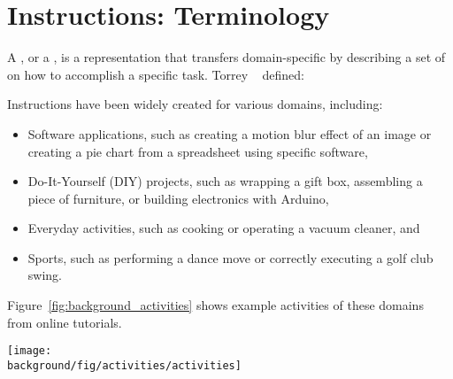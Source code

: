 
\section{Instructions: Terminology}
\label{background_terms}

A , or a , is a representation that transfers domain-specific  by describing a set of  on how to accomplish a specific task. Torrey \ea{}~\cite{Torrey:2007he} defined:
\begin{quote}
\end{quote}
%
%
Instructions have been widely created for various domains, including:

\begin{itemize}
  \item Software applications, such as creating a motion blur effect of an image or creating a pie chart from a spreadsheet using specific software,
  \item Do-It-Yourself (DIY) projects, such as wrapping a gift box, assembling a piece of furniture, or building electronics with Arduino,
  \item Everyday activities, such as cooking or operating a vacuum cleaner, and
  \item Sports, such as performing a dance move or correctly executing a golf club swing.
\end{itemize}

Figure~\ref{fig:background_activities} shows example activities of these domains from online tutorials.
\\

\begin{figure*}[b!]
  \centering
  \begin{minipage}{\textwidth}
  \texttt{[image: \\background/fig/activities/activities]}
  \caption[Example activities in tutorial domains.]{Example activities in tutorial domains:
  a) image manipulations using a software application
  \footnote{``Photoshop Playbook: Selective Focus'', \url{https://youtu.be/Wh3ahxqDnyw} \copyright2016 with express permission from Adobe Systems Incorporated.},
  b) wrapping a gift, a DIY task
  \footnote{``How to do a Japanese Gift Wrap'' by Rouge Shop, \url{https://youtu.be/Mf3IyeMF8ug}, licensed under CC BY 2.0},
  c) cooking, an everyday activity
  \footnote{``How to Cook a Turkey in a Convection Oven'' by Six Sisters' Stuff, \url{https://youtu.be/QNkwKj1Vsuc}, licensed under CC BY 2.0}, and
  d) golf lessons in sports
  \footnote{``Pat's Golf Tips Top of Swing Position'' by Blue Rock Golf Academy, \url{https://youtu.be/H06o7fMQSi4}, licensed under CC BY 2.0}.
  }
  \label{fig:background_activities}
  \end{minipage}
\end{figure*}


